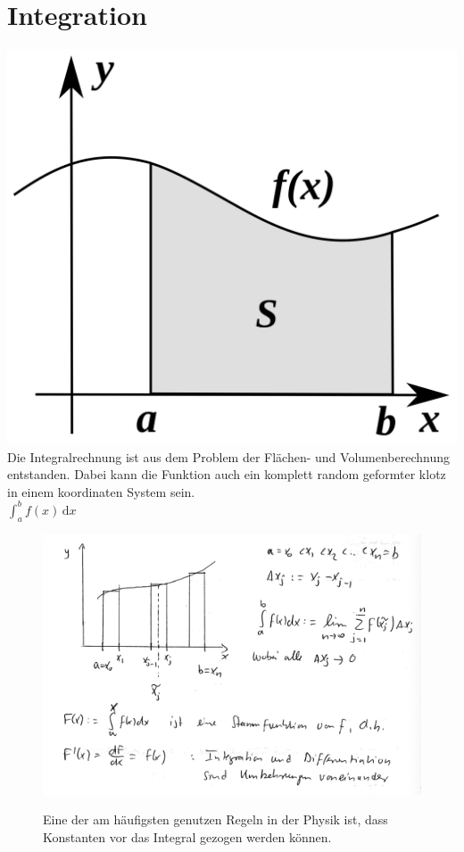 \documentclass[11pt]{article}
\begin{document}
	\section{Integration}
	\includegraphics[scale=0.05]{integral.png}
	Die Integralrechnung ist aus dem Problem der Flächen- und Volumenberechnung entstanden.
	Dabei kann die Funktion auch ein komplett random geformter klotz in einem koordinaten System sein.\\
	$\int_a^b f(x)\,\mathrm dx$\\
	\begin{figure}[htbp]
		\begin{minipage}[t]{6cm}
			\vspace{0pt}
			\centering
			\includegraphics[scale=0.45]{Integrationbeispiel.png}
		\end{minipage}
		\hfill
		\begin{minipage}[t]{6cm}
			\vspace{0pt}
			Eine der am  häufigsten genutzen Regeln in der Physik ist, dass Konstanten vor das Integral gezogen werden können.
		\end{minipage}
	\end{figure}
\end{document}
